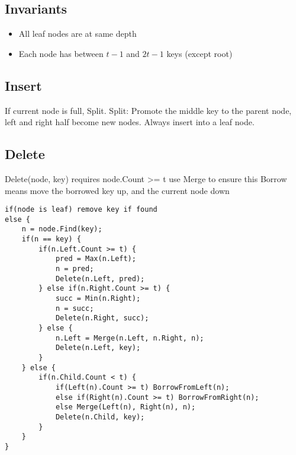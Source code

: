 \documentclass{article}
\begin{document}
\subsection*{Invariants}
\begin{itemize}
    \item All leaf nodes are at same depth
    \item Each node has between \(t-1\) and \(2t-1\) keys (except root)
\end{itemize}
\subsection*{Insert}
If current node is full, Split.
Split: Promote the middle key to the parent node, left and right half become new nodes.
Always insert into a leaf node.

\subsection*{Delete}
Delete(node, key) requires node.Count >= t
use Merge to ensure this
Borrow means move the borrowed key up, and the current node down
\begin{lstlisting}
if(node is leaf) remove key if found
else {
    n = node.Find(key);
    if(n == key) {
        if(n.Left.Count >= t) {
            pred = Max(n.Left);
            n = pred;
            Delete(n.Left, pred);
        } else if(n.Right.Count >= t) {
            succ = Min(n.Right);
            n = succ;
            Delete(n.Right, succ);
        } else {
            n.Left = Merge(n.Left, n.Right, n);
            Delete(n.Left, key);
        }
    } else {
        if(n.Child.Count < t) {
            if(Left(n).Count >= t) BorrowFromLeft(n);
            else if(Right(n).Count >= t) BorrowFromRight(n);
            else Merge(Left(n), Right(n), n);
            Delete(n.Child, key);
        }
    }
}
\end{lstlisting}
\end{document}
